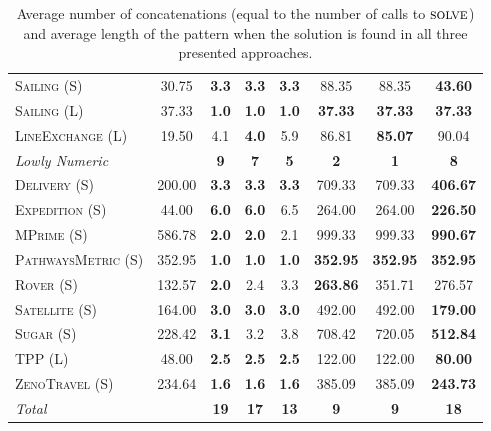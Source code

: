 \documentclass[11pt]{article}
\begin{document}
\begin{table}[tb]
{\begin{tabular}{|l||c||ccc||ccc||}
\textsc{Sailing} (S)&30.75&\textbf{3.3}&\textbf{3.3}&\textbf{3.3}&88.35&88.35&\textbf{43.60}\\
\textsc{Sailing} (L)&37.33&\textbf{1.0}&\textbf{1.0}&\textbf{1.0}&\textbf{37.33}&\textbf{37.33}&\textbf{37.33}\\
\textsc{LineExchange} (L)&19.50&4.1&\textbf{4.0}&5.9&86.81&\textbf{85.07}&90.04
\\\hline
\textit{Lowly Numeric}&&\textbf{9}&\textbf{7}&\textbf{5}&\textbf{2}&\textbf{1}&\textbf{8}\\\hline
\textsc{Delivery} (S)&200.00&\textbf{3.3}&\textbf{3.3}&\textbf{3.3}&709.33&709.33&\textbf{406.67}\\
\textsc{Expedition} (S)&44.00&\textbf{6.0}&\textbf{6.0}&6.5&264.00&264.00&\textbf{226.50}\\
\textsc{MPrime} (S)&586.78&\textbf{2.0}&\textbf{2.0}&2.1&999.33&999.33&\textbf{990.67}\\
\textsc{PathwaysMetric} (S)&352.95&\textbf{1.0}&\textbf{1.0}&\textbf{1.0}&\textbf{352.95}&\textbf{352.95}&\textbf{352.95}\\
\textsc{Rover} (S)&132.57&\textbf{2.0}&2.4&3.3&\textbf{263.86}&351.71&276.57\\
\textsc{Satellite} (S)&164.00&\textbf{3.0}&\textbf{3.0}&\textbf{3.0}&492.00&492.00&\textbf{179.00}\\
\textsc{Sugar} (S)&228.42&\textbf{3.1}&3.2&3.8&708.42&720.05&\textbf{512.84}\\
\textsc{TPP} (L)&48.00&\textbf{2.5}&\textbf{2.5}&\textbf{2.5}&122.00&122.00&\textbf{80.00}\\
\textsc{ZenoTravel} (S)&234.64&\textbf{1.6}&\textbf{1.6}&\textbf{1.6}&385.09&385.09&\textbf{243.73}
\\\hline
\textit{Total}&&\textbf{19}&\textbf{17}&\textbf{13}&\textbf{9}&\textbf{9}&\textbf{18}\\\hline

        \end{tabular}}
        \caption{Average number of concatenations (equal to the number of calls to $\textsc{solve}$) and average length of the pattern when the solution is found in all three presented approaches.}
        \label{tab:exp-search}
        \end{table}
        
\end{document}
